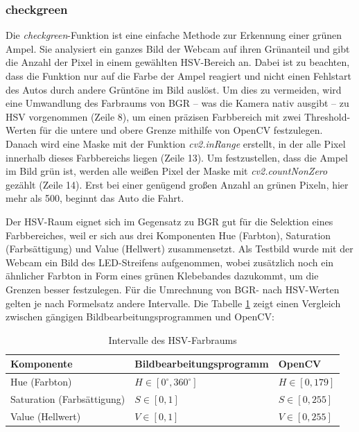 \documentclass[a4paper, 12pt]{scrartcl}
\begin{document}
\subsubsection{checkgreen}


Die \textit{checkgreen}-Funktion ist eine einfache Methode zur Erkennung einer grünen Ampel. Sie analysiert ein ganzes Bild der Webcam auf ihren Grünanteil und gibt die Anzahl der Pixel in einem gewählten HSV-Bereich an. Dabei ist zu beachten, dass die Funktion nur auf die Farbe der Ampel reagiert und nicht einen Fehlstart des Autos durch andere Grüntöne im Bild auslöst. Um dies zu vermeiden, wird eine Umwandlung des Farbraums von BGR -- was die Kamera nativ ausgibt -- zu HSV vorgenommen (Zeile 8), um einen präzisen Farbbereich mit zwei Threshold-Werten für die untere und obere Grenze mithilfe von OpenCV festzulegen. Danach wird eine Maske mit der Funktion \textit{cv2.inRange} erstellt, in der alle Pixel innerhalb dieses Farbbereichs liegen (Zeile 13).
Um festzustellen, dass die Ampel im Bild grün ist, werden alle weißen Pixel der Maske mit \textit{cv2.countNonZero} gezählt (Zeile 14). Erst bei einer genügend großen Anzahl an grünen Pixeln, hier mehr als 500, beginnt das Auto die Fahrt.

Der HSV-Raum eignet sich im Gegensatz zu BGR gut für die Selektion eines Farbbereiches, weil er sich aus drei Komponenten Hue (Farbton), Saturation (Farbsättigung) und Value (Hellwert) zusammensetzt. Als Testbild wurde mit der Webcam ein Bild des LED-Streifens aufgenommen, wobei zusätzlich noch ein ähnlicher Farbton in Form eines grünen Klebebandes dazukommt, um die Grenzen besser festzulegen. Für die Umrechnung von BGR- nach HSV-Werten gelten je nach Formelsatz andere Intervalle. Die Tabelle \ref{hsv} zeigt einen Vergleich zwischen gängigen Bildbearbeitungsprogrammen und OpenCV:

\begin{table}[H]
	\centering
	\begin{tabular}{l|l|l}
		Komponente & Bildbearbeitungsprogramm & OpenCV
		\\
		\hline
		Hue (Farbton) & $H\in\left[0^\circ, 360^\circ\right]$ & $H\in\left[0, 179\right]$
		\\
		Saturation (Farbsättigung) & $S\in\left[0, 1\right]$ & $S\in\left[0, 255\right]$
		\\
		Value (Hellwert) & $V\in\left[0, 1\right]$ & $V\in\left[0, 255\right]$
	\end{tabular} 
	\caption{Intervalle des HSV-Farbraums}
	\label{hsv}
\end{table}
\end{document}
